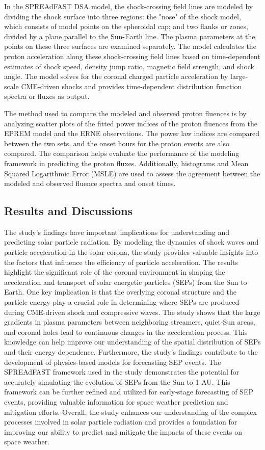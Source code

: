 In the SPREAdFAST DSA model, the shock-crossing field lines are modeled by dividing the shock surface into three regions: the "nose" of the shock model, which consists of model points on the spheroidal cap; and two flanks or zones, divided by a plane parallel to the Sun-Earth line. The plasma parameters at the points on these three surfaces are examined separately. The model calculates the proton acceleration along these shock-crossing field lines based on time-dependent estimates of shock speed, density jump ratio, magnetic field strength, and shock angle. The model solves for the coronal charged particle acceleration by large-scale CME-driven shocks and provides time-dependent distribution function spectra or fluxes as output.

The method used to compare the modeled and observed proton fluences is by analyzing scatter plots of the fitted power indices of the proton fluences from the EPREM model and the ERNE observations. The power law indices are compared between the two sets, and the onset hours for the proton events are also compared. The comparison helps evaluate the performance of the modeling framework in predicting the proton fluxes. Additionally, histograms and Mean Squared Logarithmic Error (MSLE) are used to assess the agreement between the modeled and observed fluence spectra and onset times.

\subsection{Results and Discussions}
The study's findings have important implications for understanding and predicting solar particle radiation. By modeling the dynamics of shock waves and particle acceleration in the solar corona, the study provides valuable insights into the factors that influence the efficiency of particle acceleration. The results highlight the significant role of the coronal environment in shaping the acceleration and transport of solar energetic particles (SEPs) from the Sun to Earth. One key implication is that the overlying coronal structure and the particle energy play a crucial role in determining where SEPs are produced during CME-driven shock and compressive waves. The study shows that the large gradients in plasma parameters between neighboring streamers, quiet-Sun areas, and coronal holes lead to continuous changes in the acceleration process. This knowledge can help improve our understanding of the spatial distribution of SEPs and their energy dependence. Furthermore, the study's findings contribute to the development of physics-based models for forecasting SEP events. The SPREAdFAST framework used in the study demonstrates the potential for accurately simulating the evolution of SEPs from the Sun to 1 AU. This framework can be further refined and utilized for early-stage forecasting of SEP events, providing valuable information for space weather prediction and mitigation efforts. Overall, the study enhances our understanding of the complex processes involved in solar particle radiation and provides a foundation for improving our ability to predict and mitigate the impacts of these events on space weather.

